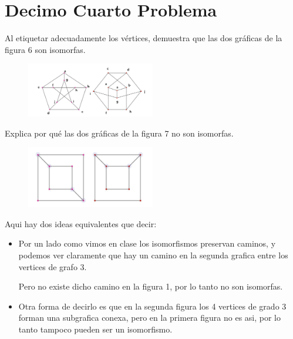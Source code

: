 \documentclass[journal,12pt,onecolumn]{IEEEtran}                %
\theoremstyle{break}                                            %
\begin{document}
    \clearpage
    \section*{Decimo Cuarto Problema}

        Al etiquetar adecuadamente los vértices, demuestra 
        que las dos gráficas de la figura 6 son isomorfas.
        \begin{figure}[h]
            \includegraphics[width=0.5\textwidth]{141}
        \end{figure}

        Explica por qué las dos gráficas de la 
        figura 7 no son isomorfas.
        \begin{figure}[h]
            \includegraphics[width=0.5\textwidth]{142}
        \end{figure}

        Aqui hay dos ideas equivalentes que decir:
        \begin{itemize}
            \item Por un lado como vimos en clase los isomorfismos
            preservan caminos, y podemos ver claramente que hay un
            camino en la segunda grafica entre los vertices de grafo 3.

            Pero no existe dicho camino en la figura 1, por lo tanto no 
            son isomorfas.

            \item Otra forma de decirlo es que en la segunda figura los
            4 vertices de grado 3 forman una subgrafica conexa, pero 
            en la primera figura no es asi, por lo tanto tampoco pueden ser
            un isomorfismo.
        \end{itemize}
\end{document}
